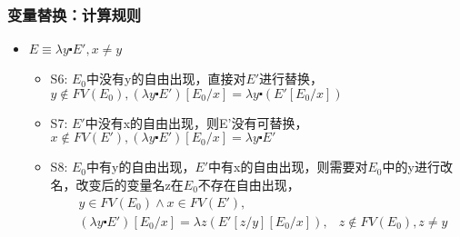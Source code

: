 \documentclass[CJK,compress,hyperref]{beamer}
\begin{document}
\begin{CJK}{UTF8}{song}
\begin{frame}
  \frametitle{变量替换：计算规则} 
  \begin{itemize}
  \item  $E \equiv \lambda y \centerdot E', x \neq y$ 
    \begin{itemize}
    \item {S6:} $E_0$中没有y的自由出现，直接对$E'$进行替换，
      $ y \not \in FV(E_0),   (\lambda y
      \centerdot E') [E_0/x] = \lambda y \centerdot
      (E'[E_0/x]) $
    \item {S7:} $E'$中没有x的自由出现，则E'没有可替换，
      $ x \not \in FV(E'),   (\lambda y \centerdot E')
      [E_0/x] = \lambda y
      \centerdot E' $
    \item{S8:}  $E_0$中有y的自由出现，$E'$中有x的自由出现，则需要对$E_0$中的y进行改名，改变后的变量名z在$E_0$不存在自由出现，   
      \begin{eqnarray*}
        &y \in FV(E_0) \wedge x \in FV(E'), & \\   
        & (\lambda y  \centerdot  E') [E_0/x] 
          = \lambda z  (E'[z/y]  [E_0/x]),  
                                            & z \not \in FV(E_0), z \neq y   
      \end{eqnarray*} 
    \end{itemize}
  \end{itemize}
\end{frame}


\end{CJK}
\end{document}
